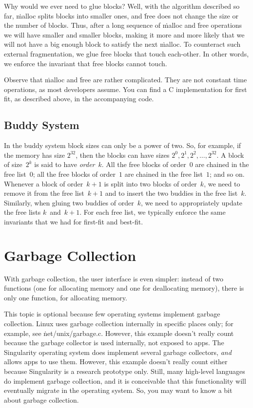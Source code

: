 Why would we ever need to glue blocks?
Well, with the algorithm described so far,
  \.{malloc} splits blocks into smaller ones,
  and \.{free} does not change the size or the number of blocks.
Thus, after a long sequence of \.{malloc} and \.{free} operations
  we will have smaller and smaller blocks,
  making it more and more likely
    that we will not have a big enough block to satisfy the next \.{malloc}.
To counteract such external fragmentation,
  we glue free blocks that touch each-other.
In other words, we enforce the invariant that free blocks cannot touch.

\smallskip
Observe that \.{malloc} and \.{free} are rather complicated.
They are not constant time operations, as most developers assume.
You can find a C implementation for first fit, as described above,
  in the accompanying code.

\subsection{Buddy System}

In the buddy system block sizes can only be a power of two.
So, for example, if the memory has size $2^{32}$,
  then the blocks can have sizes $2^0, 2^1, 2^2, \dots, 2^{32}$.
A block of size~$2^k$ is said to have \emph{order}~$k$.
All the free blocks of order~$0$ are chained in the free list~$0$;
  all the free blocks of order~$1$ are chained in the free list~$1$;
  and so on.
Whenever a block of order~$k+1$ is split into two blocks of order~$k$,
  we need to remove it from the free list~$k+1$
  and to insert the two buddies in the free list~$k$.
Similarly, when gluing two buddies of order~$k$,
  we need to appropriately update the free lists $k$~and~$k+1$.
For each free list,
  we typically enforce the same invariants that we had for first-fit and best-fit.

\section{Garbage Collection}

With garbage collection,
  the user interface is even simpler:
  instead of two functions
    (one for allocating memory and one for deallocating memory),
  there is only one function, for allocating memory.

This topic is optional
  because few operating systems implement garbage collection.
Linux uses garbage collection internally in specific places only;
  for example, see \.{net/unix/garbage.c}.
However, this example doesn't really count
  because the garbage collector is used internally, not exposed to apps.
The Singularity operating system does implement several garbage collectors,
  \emph{and} allows apps to use them.
However, this example doesn't really count either
  because Singularity is a research prototype only.
Still,
  many high-level languages do implement garbage collection,
  and it is conceivable that this functionality
    will eventually migrate in the operating system.
So, you may want to know a bit about garbage collection.


